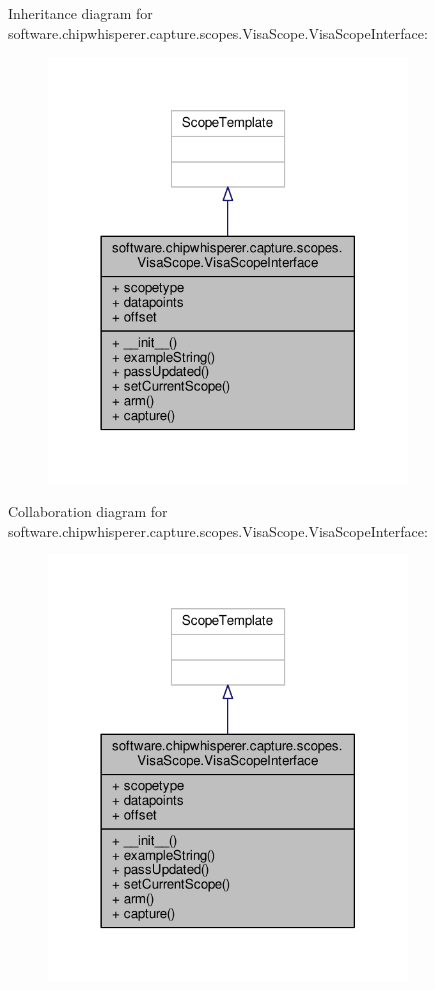 Inheritance diagram for software.\+chipwhisperer.\+capture.\+scopes.\+Visa\+Scope.\+Visa\+Scope\+Interface\+:\nopagebreak
\begin{figure}[H]
\begin{center}
\leavevmode
\includegraphics[width=270pt]{df/d29/classsoftware_1_1chipwhisperer_1_1capture_1_1scopes_1_1VisaScope_1_1VisaScopeInterface__inherit__graph}
\end{center}
\end{figure}


Collaboration diagram for software.\+chipwhisperer.\+capture.\+scopes.\+Visa\+Scope.\+Visa\+Scope\+Interface\+:\nopagebreak
\begin{figure}[H]
\begin{center}
\leavevmode
\includegraphics[width=270pt]{d8/db5/classsoftware_1_1chipwhisperer_1_1capture_1_1scopes_1_1VisaScope_1_1VisaScopeInterface__coll__graph}
\end{center}
\end{figure}


